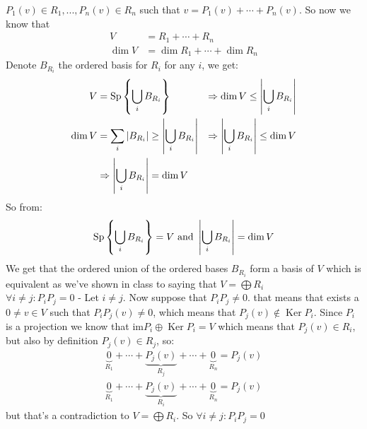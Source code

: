\documentclass[11pt, a4paper]{article}
\renewcommand{\Im}{\mathrm{im}}
\DeclareMathOperator{\Ker}{Ker}
\begin{document}
\begin{solution}
\begin{enumerate}
$P_1(v)\in R_1,...,P_n(v)\in R_n$ such that $v = P_1(v)+\cdots+P_n(v)$.
So now we know that
\begin{align*}
  V &= R_1 + \cdots + R_n \\
  \dim V &= \dim R_1 + \cdots + \dim R_n
\end{align*}
Denote $B_{R_i}$ the ordered basis for $R_i$ for any $i$, we get:
\begin{align*}
  V &= \mathrm{Sp} \left\{ \bigcup_i{B_{R_i}} \right\}
  &\Rightarrow \dim V \le \left\vert \bigcup_i{B_{R_i}} \right\vert \\
  \dim V &= \sum_i{\vert B_{R_i} \vert} \ge 
  \left \vert \bigcup_i{B_{R_i}} \right \vert
  &\Rightarrow \left \vert \bigcup_i{B_{R_i}} \right \vert \le \dim V \\
  &\Rightarrow \left \vert \bigcup_i{B_{R_i}} \right \vert = \dim V
\end{align*}
So from:
\[
  \mathrm{Sp} \left\{ \bigcup_i{B_{R_i}} \right \}   = V
  \text{ and }
  \left\lvert\bigcup_i{B_{R_i}}\right\rvert = \dim V
\]
We get that the ordered union of the ordered bases $B_{R_i}$ form a basis
of $V$ which is equivalent as we've shown in class to saying that 
$V = \bigoplus R_i$ \\
\underline{$\forall i\neq j \colon P_iP_j = 0$} - Let $i \neq j$. Now
suppose that $P_iP_j \neq 0$. that means that exists a $0 \neq v\in V$
such that $P_iP_j(v) \neq 0$, which means that $P_j(v) \notin \Ker P_i$.
Since $P_i$ is a projection we know that $\Im P_i \oplus \Ker P_i = V$
which means that $P_j(v) \in R_i$, but also by definition 
$P_j(v) \in R_j$, so:
\begin{align*}
  \underbrace{0}_{R_1} + \cdots + \underbrace{P_j(v)}_{R_j} + \cdots + 
  \underbrace{0}_{R_n} = P_j(v) \\
  \underbrace{0}_{R_1} + \cdots + \underbrace{P_j(v)}_{R_i} + \cdots + 
  \underbrace{0}_{R_n} = P_j(v) 
\end{align*}
 but that's a contradiction to $V = \bigoplus R_i$. So 
 $\forall i\neq j \colon P_iP_j = 0$

\end{enumerate}
\end{solution}
\end{document}
